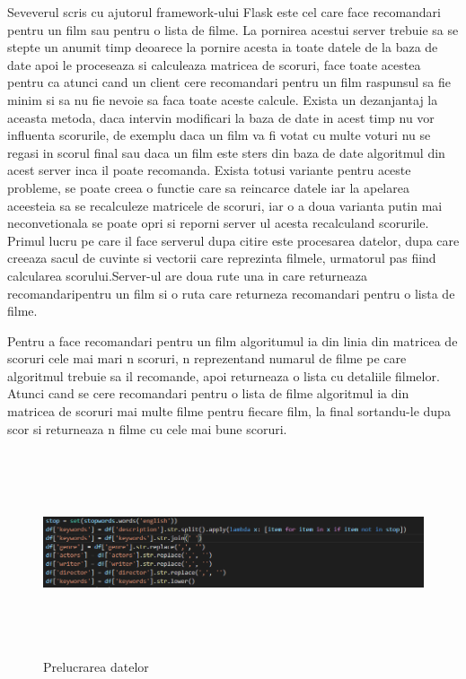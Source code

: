 \par Seveverul scris cu ajutorul framework-ului Flask este cel care face recomandari pentru un film sau pentru o lista de filme. La pornirea acestui server trebuie sa se stepte un anumit timp deoarece la pornire acesta ia toate datele de la baza de date apoi le proceseaza si calculeaza matricea de scoruri, face toate acestea pentru ca atunci cand un client cere recomandari pentru un film raspunsul sa fie minim si sa nu fie nevoie sa faca toate aceste calcule. Exista un dezanjantaj la aceasta metoda, daca intervin modificari la baza de date in acest timp nu  vor influenta scorurile, de exemplu daca un film va fi votat cu multe voturi nu se regasi in scorul final sau daca un film este sters din baza de date algoritmul din acest server inca il poate recomanda. Exista totusi variante pentru aceste probleme, se poate creea o functie care  sa reincarce datele iar la apelarea aceesteia sa se recalculeze matricele de scoruri, iar o a doua varianta putin mai neconvetionala se poate opri si reporni server ul acesta recalculand scorurile. Primul lucru pe care il face serverul dupa citire este procesarea datelor, dupa care creeaza sacul de cuvinte si vectorii care reprezinta filmele, urmatorul pas fiind calcularea scorului.Server-ul are doua rute una in care returneaza recomandaripentru un film si o ruta care returneza recomandari pentru o lista de filme.
\par Pentru a face recomandari pentru un film algoritumul ia din linia din matricea de scoruri cele mai mari n scoruri, n reprezentand numarul de filme pe care algoritmul trebuie sa il recomande, apoi returneaza o lista cu detaliile filmelor. Atunci cand se cere recomandari pentru o lista de filme algoritmul ia din matricea de scoruri mai multe filme pentru fiecare film, la final sortandu-le dupa scor si returneaza n filme cu cele mai bune scoruri. 
\begin{figure}[!h]
			\centerline{\includegraphics[width=15cm, height=6cm]{figures/prelucrare.png}}
			\caption{Prelucrarea datelor}
			\label{fig}
		\end{figure}

